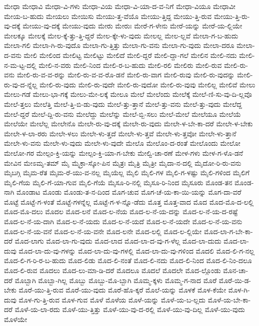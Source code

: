{ಮೇಧಾ
ಮೇಧಾವಿ
ಮೇಧಾ-ವಿ-ಗಳು
ಮೇಧಾ-ವಿಯ
ಮೇಧಾ-ವಿ-ಯಾ-ದ-ವ-ನಿಗೆ
ಮೇಧಾ-ವಿಯೂ
ಮೇಧಾವೀ
ಮೇಯ-ಬ-ಹುದು
ಮೇಯಲು
ಮೇಯಿಸು
ಮೇಯು-ತ್ತ-ವೆಯೊ
ಮೇಯು-ತ್ತಿದ್ದ
ಮೇಯು-ತ್ತಿ-ರುವ
ಮೇಯು-ತ್ತಿ-ರು-ವು-ದಕ್ಕೆ
ಮೇಯು-ವು-ದಕ್ಕೆ
ಮೇಯು-ವುದು
ಮೇರು
ಮೇರುಃ
ಮೇರೆ-ಗ-ಳೇನು
ಮೇರೆ-ಯನ್ನು
ಮೇರೆ-ಯ-ಲ್ಲಿಯೇ
ಮೇಲಕ್ಕೂ
ಮೇಲಕ್ಕೆ
ಮೇಲ-ಕ್ಕೆ-ತ್ತು-ತ್ತಿ-ದ್ದರೆ
ಮೇಲ-ಕ್ಕೇ-ಳು-ವುದು
ಮೇಲಲ್ಲ
ಮೇಲ-ಲ್ಲವೆ
ಮೇಲಾ-ಗ-ಬ-ಹುದು
ಮೇಲಾ-ಗಲಿ
ಮೇಲಾ-ಗಿ-ರು-ವುದೊ
ಮೇಲಾ-ಗು-ತ್ತಿತ್ತು
ಮೇಲಾ-ಗು-ವನು
ಮೇಲಾ-ಗು-ವುದು
ಮೇಲಾ-ದರೂ
ಮೇಲಾ-ದ-ವನು
ಮೇಲಿ
ಮೇಲಿಂದ
ಮೇಲಿಟ್ಟ
ಮೇಲಿಟ್ಟು
ಮೇಲಿದೆ
ಮೇಲಿ-ದ್ದರೆ
ಮೇಲಿ-ದ್ದಾ-ಗಲೆ
ಮೇಲಿನ
ಮೇಲಿ-ನದು
ಮೇಲಿ-ನ-ಮ-ಟ್ಟ-ದಲ್ಲಿ
ಮೇಲಿ-ನ-ವರು
ಮೇಲಿ-ನಿಂದ
ಮೇಲಿ-ರ-ಬ-ಹುದು
ಮೇಲಿ-ರಲಿ
ಮೇಲಿರು
ಮೇಲಿ-ರುವ
ಮೇಲಿ-ರು-ವನು
ಮೇಲಿ-ರು-ವ-ವ-ರನ್ನು
ಮೇಲಿ-ರು-ವ-ವ-ರೊ-ಡನೆ
ಮೇಲಿ-ರು-ವಾಗ
ಮೇಲಿ-ರುವು
ಮೇಲಿ-ರು-ವುದನ್ನು
ಮೇಲಿ-ರು-ವು-ದ-ನ್ನೆಲ್ಲ
ಮೇಲಿ-ರು-ವುದು
ಮೇಲಿ-ರು-ವುದೇ
ಮೇಲಿ-ರು-ವುದೋ
ಮೇಲಿ-ರು-ವುವು
ಮೇಲಿಲ್ಲ
ಮೇಲಿವೆ
ಮೇಲು
ಮೇಲು-ಗಡೆ
ಮೇಲು-ಭಾ-ಗಕ್ಕೆ
ಮೇಲು-ಮೇ-ಲಕ್ಕೆ
ಮೇಲೂ
ಮೇಲೆ
ಮೇಲೆಂದು
ಮೇಲೆಕ್ಕೆ
ಮೇಲೆ-ಣಿ-ಸು-ವು-ದಿ-ಲ್ಲವೊ
ಮೇಲೆ-ತ್ತಲು
ಮೇಲೆತ್ತಿ
ಮೇಲೆ-ತ್ತಿ-ಬಿ-ಡು-ವುದು
ಮೇಲೆ-ತ್ತು-ತ್ತಾನೆ
ಮೇಲೆ-ತ್ತು-ವನು
ಮೇಲೆ-ತ್ತು-ವುದು
ಮೇಲೆದ್ದ
ಮೇಲೆ-ದ್ದರೆ
ಮೇಲೆ-ದ್ದಿ-ರು-ವನು
ಮೇಲೆದ್ದು
ಮೇಲೆನ್ನು
ಮೇಲೆ-ಬ್ಬಿ-ಸಲು
ಮೇಲೆ-ಮೇಲೆ
ಮೇಲೆಯೂ
ಮೇಲೆಯೆ
ಮೇಲೆಯೇ
ಮೇಲೆಲ್ಲ
ಮೇಲೇನೊ
ಮೇಲೇ-ರು-ವು-ದಕ್ಕೆ
ಮೇಲೇ-ರು-ವುದು
ಮೇಲೇ-ಳ-ಬೇ-ಕಾ-ದರೆ
ಮೇಲೇ-ಳ-ಬೇಕು
ಮೇಲೇ-ಳ-ಲಾ-ರರು
ಮೇಲೇ-ಳಲು
ಮೇಲೇ-ಳು-ತ್ತದೆ
ಮೇಲೇ-ಳು-ತ್ತವೆ
ಮೇಲೇ-ಳು-ತ್ತವೋ
ಮೇಲೇ-ಳು-ತ್ತಾನೆ
ಮೇಲೇ-ಳು-ವನು
ಮೇಲೇ-ಳು-ವುದು
ಮೇಲೇ-ಳು-ವುದೇ
ಮೇಲೊ
ಮೇಲೊಂ-ದ-ರಂತೆ
ಮೇಲೊಂದು
ಮೇಲೋ
ಮೇಲೋ-ಗರ
ಮೇಲ್ಪಂ-ಕ್ತಿ-ಯನ್ನು
ಮೇಲ್ಪಂ-ಕ್ತಿ-ಯಾ-ಗ-ಬೇಕು
ಮೇಲ್ವಿ-ಚಾ-ರಣೆ
ಮೇಳ-ಗಳು
ಮೇಳ-ಗ-ಳೊ-ಡನೆ
ಮೇವಿನ
ಮೇಽಮೃ-ತಮ್
ಮೈ
ಮೈಕ್ರಾ-ಸ್ಕೋ-ಪಿನ
ಮೈತ್ರಃ
ಮೈತ್ರಿ
ಮೈತ್ರೀ
ಮೈದಾ-ನ-ದಲ್ಲಿ
ಮೈದೋ-ರಿ-ರು-ವನು
ಮೈಬಗ್ಗಿ
ಮೈಮ-ರೆತ
ಮೈಮ-ರೆ-ಯು-ವ-ನಲ್ಲ
ಮೈಯೆಲ್ಲ
ಮೈಲಿ
ಮೈಲಿ-ಗಳ
ಮೈಲಿ-ಗ-ಳಷ್ಟು
ಮೈಲಿ-ಗಳಿಂದ
ಮೈಲಿಗೆ
ಮೈಲಿ-ಗೆಯ
ಮೈಲಿ-ಗೆ-ಯಾ-ಗುವ
ಮೈಲಿ-ಗೆಯೆ
ಮೈಸೂ-ರಿ-ನಲ್ಲಿ
ಮೈಸೂ-ರಿ-ನಿಂದ
ಮೈಸೂರು
ಮೊಂಡ-ತನ
ಮೊಂಡ-ನಾಗಿ
ಮೊಂಡಾಟ
ಮೊಂಡು
ಮೊಂಡು-ತ-ನ-ದಿಂದ
ಮೊಗ-ಚುವ
ಮೊಗ-ಚೆ-ಯ-ಕಾ-ಯಿ-ಯನ್ನು
ಮೊಗ-ದಾ-ವರೆ
ಮೊಟ್ಟೆ
ಮೊಟ್ಟೆ-ಗ-ಳಂತೆ
ಮೊಟ್ಟೆ-ಗಳನ್ನೆಲ್ಲ
ಮೊಟ್ಟೆ-ಗ-ಳ-ನ್ನೊ-ಡೆದು
ಮೊತ್ತ
ಮೊತ್ತ-ವಾದ
ಮೊದ
ಮೊದ-ಮೊ-ದ-ಲಲ್ಲಿ
ಮೊದ-ಮೊ-ದಲು
ಮೊದಲ
ಮೊದ-ಲನೆ
ಮೊದ-ಲ-ನೆಯ
ಮೊದ-ಲ-ನೆ-ಯ-ದನ್ನು
ಮೊದ-ಲ-ನೆ-ಯ-ದ-ರಷ್ಟೆ
ಮೊದ-ಲ-ನೆ-ಯ-ದಾಗಿ
ಮೊದ-ಲ-ನೆ-ಯದು
ಮೊದ-ಲ-ನೆ-ಯದೆ
ಮೊದ-ಲ-ನೆ-ಯದೇ
ಮೊದ-ಲ-ನೆ-ಯ-ವನು
ಮೊದ-ಲ-ನೆ-ಯ-ವನೆ
ಮೊದ-ಲ-ನೆ-ಯ-ವನೇ
ಮೊದ-ಲನೇ
ಮೊದ-ಲಲ್ಲಿ
ಮೊದ-ಲ-ಲ್ಲಿಯೇ
ಮೊದ-ಲಾ-ಗ-ಬೇ-ಕಾ-ದರೆ
ಮೊದ-ಲಾಗು
ಮೊದ-ಲಾ-ಗು-ವುದು
ಮೊದ-ಲಾದ
ಮೊದ-ಲಾ-ದ-ವು-ಗ-ಳೆಲ್ಲ
ಮೊದ-ಲಾ-ದುದು
ಮೊದ-ಲಾ-ದುವು
ಮೊದ-ಲಾ-ದು-ವು-ಗಳನ್ನು
ಮೊದ-ಲಾ-ದು-ವು-ಗಳಲ್ಲಿ
ಮೊದ-ಲಾ-ದು-ವು-ಗಳಿಂದ
ಮೊದಲಿ
ಮೊದ-ಲಿ-ಗ-ನಲ್ಲ
ಮೊದ-ಲಿ-ಗ-ರಿ-ರ-ಬ-ಹುದು
ಮೊದ-ಲಿಡು
ಮೊದ-ಲಿ-ನಂತೆ
ಮೊದ-ಲಿ-ನದು
ಮೊದ-ಲಿ-ನಿಂದ
ಮೊದ-ಲಿ-ನಿಂ-ದಲೂ
ಮೊದ-ಲಿ-ರುವ
ಮೊದಲು
ಮೊದ-ಲು-ಮಾ-ಡಿ-ದರೆ
ಮೊದಲೂ
ಮೊದಲೆ
ಮೊದಲೇ
ಮೊದ-ಲ್ಗೊಂಡು
ಮೊನ-ಚಾ-ದರೆ
ಮೊಬ್ಬಾಗಿ
ಮೊಬ್ಬಾ-ಗಿಲ್ಲ
ಮೊಬ್ಬು
ಮೊಬ್ಬು-ಮೊ-ಬ್ಬಾಗಿ
ಮೊಮ್ಮ-ಕ್ಕಳು
ಮೊಮ್ಮ-ಗ-ನಾದ
ಮೊರೆ
ಮೊರೆ-ಯಿ-ಡ-ಬೇಕು
ಮೊರೆ-ಯು-ತ್ತಿ-ರುವ
ಮೊರೆ-ಯು-ವುದು
ಮೊರೆ-ಹೊ-ಕ್ಕರೆ
ಮೊಲೆ-ಯನ್ನು
ಮೊಳಕೆ
ಮೊಳ-ಕೆಯೇ
ಮೊಳ-ಗಿ-ದುವು
ಮೊಳ-ಗು-ತ್ತಿ-ರುವ
ಮೊಳ-ಗುವ
ಮೊಳೆ
ಮೊಳೆಯ
ಮೊಳೆ-ಯನ್ನು
ಮೊಳೆ-ಯ-ಬ-ಲ್ಲದು
ಮೊಳೆ-ಯ-ಬೇ-ಕಾ-ದರೆ
ಮೊಳೆ-ಯ-ಲಾ-ರದು
ಮೊಳೆ-ಯು-ತ್ತಿತ್ತು
ಮೊಳೆ-ಯು-ವು-ದ-ರಲ್ಲಿ
ಮೊಳೆ-ಯು-ವು-ದಿಲ್ಲ
ಮೊಳೆ-ಯು-ವುದು
ಮೊಳೆಯೇ
}
